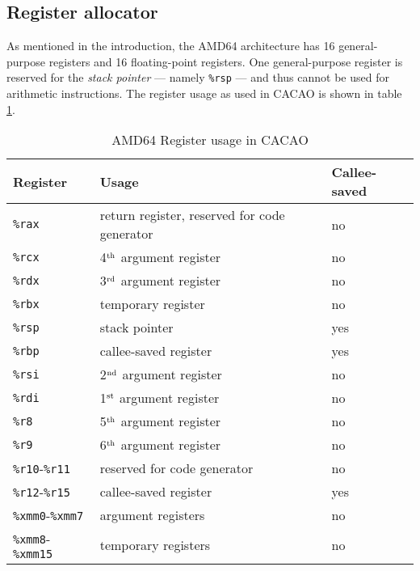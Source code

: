 \subsection{Register allocator}

As mentioned in the introduction, the AMD64 architecture has 16
general-purpose registers and 16 floating-point registers. One
general-purpose register is reserved for the \textit{stack pointer}
--- namely \texttt{\%rsp} --- and thus cannot be used for arithmetic
instructions. The register usage as used in CACAO is shown in table
\ref{amd64registerusage}.

\begin{table}
\begin{center}
\begin{tabular}{l|l|l}
Register       & Usage                                        & Callee-saved \\ \hline
\texttt{\%rax} & return register, reserved for code generator & no           \\
\texttt{\%rcx} & 4$^{\rm th}$ argument register               & no           \\
\texttt{\%rdx} & 3$^{\rm rd}$ argument register               & no           \\
\texttt{\%rbx} & temporary register                           & no           \\
\texttt{\%rsp} & stack pointer                                & yes          \\
\texttt{\%rbp} & callee-saved register                        & yes          \\
\texttt{\%rsi} & 2$^{\rm nd}$ argument register               & no           \\
\texttt{\%rdi} & 1$^{\rm st}$ argument register               & no           \\
\texttt{\%r8}  & 5$^{\rm th}$ argument register               & no           \\
\texttt{\%r9}  & 6$^{\rm th}$ argument register               & no           \\
\texttt{\%r10}-\texttt{\%r11} & reserved for code generator   & no           \\
\texttt{\%r12}-\texttt{\%r15} & callee-saved register         & yes          \\
\texttt{\%xmm0}-\texttt{\%xmm7} & argument registers          & no           \\
\texttt{\%xmm8}-\texttt{\%xmm15} & temporary registers        & no           \\
\end{tabular}
\caption{AMD64 Register usage in CACAO}
\label{amd64registerusage}
\end{center}
\end{table}

